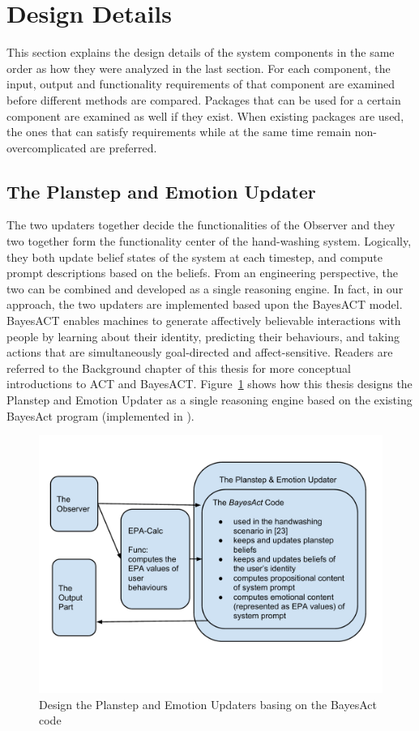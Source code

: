 \section{Design Details}
\label{sec:design-details}

This section explains the design details of the system components in the same order as how they were analyzed in the last section. For each component, the input, output and functionality requirements of that component are examined before different methods are compared. Packages that can be used for a certain component are examined as well if they exist. When existing packages are used, the ones that can satisfy requirements while at the same time remain non-overcomplicated are preferred.

\subsection{The Planstep and Emotion Updater}

The two updaters together decide the functionalities of the Observer and they two together form the functionality center of the hand-washing system. Logically, they both update belief states of the system at each timestep, and compute prompt descriptions based on the beliefs. From an engineering perspective, the two can be combined and developed as a single reasoning engine. In fact, in our approach, the two updaters are implemented based upon the BayesACT model. BayesACT enables machines to generate affectively believable interactions with people by learning about their identity, predicting their behaviours, and taking actions that are simultaneously goal-directed and affect-sensitive. Readers are referred to the Background chapter of this thesis for more conceptual introductions to ACT and BayesACT. Figure~\ref{fig:updater} shows how this thesis designs the Planstep and Emotion Updater as a single reasoning engine based on the existing BayesAct program (implemented in \cite{hoey2013bayesian}).

\begin{figure}[h!]
\centering
\includegraphics[width=0.9\linewidth]{fig-updater.pdf}
\caption{Design the Planstep and Emotion Updaters basing on the BayesAct code}
\label{fig:updater}
\end{figure}

